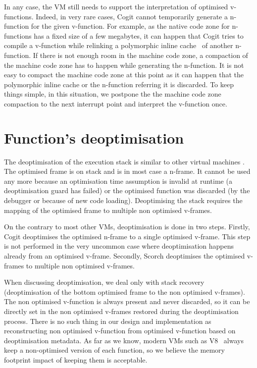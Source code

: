 \documentclass[a4paper,12pt,twoside]{../includes/ThesisStyle}
\begin{document}
In any case, the VM still needs to support the interpretation of optimised v-functions. Indeed, in very rare cases, Cogit cannot temporarily generate a n-function for the given v-function. For example, as the native code zone for n-functions has a fixed size of a few megabytes, it can happen that Cogit tries to compile a v-function while relinking a polymorphic inline cache~\cite{Holz91a} of another n-function. If there is not enough room in the machine code zone, a compaction of the machine code zone has to happen while generating the n-function. It is not easy to compact the machine code zone at this point as it can happen that the polymorphic inline cache or the n-function referring it is discarded. To keep things simple, in this situation, we postpone the the machine code zone compaction to the next interrupt point and interpret the v-function once.


\section {Function's deoptimisation}

The deoptimisation of the execution stack is similar to other virtual machines \cite{Fin03a, Holz92a}. The optimised frame is on stack and is in most case a n-frame. It cannot be used any more because an optimisation time assumption is invalid at runtime (a deoptimisation guard has failed) or the optimised function was discarded (by the debugger or because of new code loading). Deoptimising the stack requires the mapping of the optimised frame to multiple non optimised v-frames. 

On the contrary to most other VMs, deoptimisation is done in two steps. Firstly, Cogit deoptimises the optimised n-frame to a single optimised v-frame. This step is not performed in the very uncommon case where deoptimisation happens already from an optimised v-frame. Secondly, Scorch deoptimises the optimised v-frames to multiple non optimised v-frames.

When discussing deoptimisation, we deal only with stack recovery (deoptimisation of the bottom optimised frame to the non optimised v-frames). The non optimised v-function is always present and never discarded, so it can be directly set in the non optimised v-frames restored during the deoptimisation process. There is no such thing in our design and implementation as reconstructing non optimised v-function from optimised v-function based on deoptimisation metadata. As far as we know, modern VMs such as V8~\cite{V8} always keep a non-optimised version of each function, so we believe the memory footprint impact of keeping them is acceptable.
\end{document}
